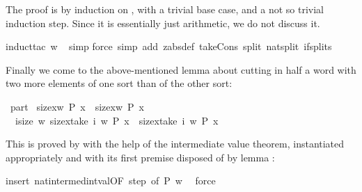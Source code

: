 \begin{isabellebody}
\begin{isamarkuptxt}
The proof is by induction on , with a trivial base case, and a not
so trivial induction step. Since it is essentially just arithmetic, we do not
discuss it.%
\end{isamarkuptxt}%
\isamarkuptrue%
induct{\isacharunderscore}tac\ w{\isacharparenright}\isanewline
\ \isamarkupfalse%
simp{\isacharparenright}\isanewline
\isamarkupfalse%
force\ simp\ add{\isacharcolon}\ zabs{\isacharunderscore}def\ take{\isacharunderscore}Cons\ split{\isacharcolon}\ nat{\isachardot}split\ if{\isacharunderscore}splits{\isacharparenright}\isamarkupfalse%
%
\begin{isamarkuptext}%
Finally we come to the above-mentioned lemma about cutting in half a word with two more elements of one sort than of the other sort:%
\end{isamarkuptext}%
\isamarkuptrue%
\ part{}{\isacharcolon}\isanewline
\ {\isachardoublequote}size{\isacharbrackleft}x{\isasymin}w{\isachardot}\ P\ x{\isacharbrackright}\ {\isacharequal}\ size{\isacharbrackleft}x{\isasymin}w{\isachardot}\ {\isasymnot}P\ x{\isacharbrackright}{\isacharplus}{}\ {\isasymLongrightarrow}\isanewline
\ \ {\isasymexists}i{\isasymle}size\ w{\isachardot}\ size{\isacharbrackleft}x{\isasymin}take\ i\ w{\isachardot}\ P\ x{\isacharbrackright}\ {\isacharequal}\ size{\isacharbrackleft}x{\isasymin}take\ i\ w{\isachardot}\ {\isasymnot}P\ x{\isacharbrackright}{\isacharplus}{}{\isachardoublequote}\isamarkupfalse%
%
\begin{isamarkuptxt}%
\noindent
This is proved by  with the help of the intermediate value theorem,
instantiated appropriately and with its first premise disposed of by lemma
:%
\end{isamarkuptxt}%
\isamarkuptrue%
insert\ nat{}{\isacharunderscore}intermed{\isacharunderscore}int{\isacharunderscore}val{\isacharbrackleft}OF\ step{}{\isacharcomma}\ of\ {\isachardoublequote}P{\isachardoublequote}\ {\isachardoublequote}w{\isachardoublequote}\ {\isachardoublequote}{}{\isachardoublequote}{\isacharbrackright}{\isacharparenright}\isanewline
\isamarkupfalse%
\ force\isamarkupfalse%
%
\begin{isamarkuptext}%
\noindent


\end{isamarkuptext}
\end{isabellebody}
